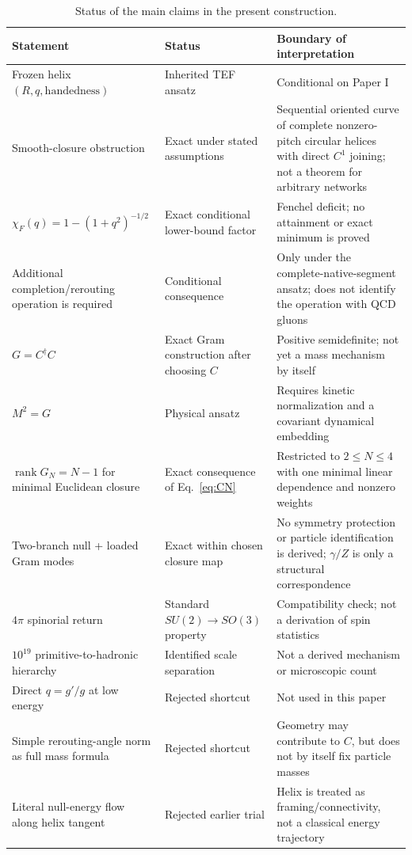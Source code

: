 \documentclass[10pt]{article}
\newcommand{\rank}{\operatorname{rank}}
\begin{document}
\begin{table}[t]
\centering
\caption{Status of the main claims in the present construction.}
\label{tab:evidence}
\small
\begin{tabular}{p{} p{} p{}}
\toprule
Statement & Status & Boundary of interpretation \\
\midrule
Frozen helix $(R,q,\text{handedness})$ & Inherited TEF ansatz & Conditional on Paper I \\
Smooth-closure obstruction & Exact under stated assumptions & Sequential oriented curve of complete nonzero-pitch circular helices with direct $C^1$ joining; not a theorem for arbitrary networks \\
$\chi_F(q)=1-(1+q^2)^{-1/2}$ & Exact conditional lower-bound factor & Fenchel deficit; no attainment or exact minimum is proved \\
Additional completion/rerouting operation is required & Conditional consequence & Only under the complete-native-segment ansatz; does not identify the operation with QCD gluons \\
$G=C^\dagger C$ & Exact Gram construction after choosing $C$ & Positive semidefinite; not yet a mass mechanism by itself \\
$M^2=G$ & Physical ansatz & Requires kinetic normalization and a covariant dynamical embedding \\
$\rank G_N=N-1$ for minimal Euclidean closure & Exact consequence of Eq.~\eqref{eq:CN} & Restricted to $2\le N\le4$ with one minimal linear dependence and nonzero weights \\
Two-branch null + loaded Gram modes & Exact within chosen closure map & No symmetry protection or particle identification is derived; $\gamma/Z$ is only a structural correspondence \\
$4\pi$ spinorial return & Standard $SU(2)\to SO(3)$ property & Compatibility check; not a derivation of spin statistics \\
$10^{19}$ primitive-to-hadronic hierarchy & Identified scale separation & Not a derived mechanism or microscopic count \\
Direct $q=g'/g$ at low energy & Rejected shortcut & Not used in this paper \\
Simple rerouting-angle norm as full mass formula & Rejected shortcut & Geometry may contribute to $C$, but does not by itself fix particle masses \\
Literal null-energy flow along helix tangent & Rejected earlier trial & Helix is treated as framing/connectivity, not a classical energy trajectory \\
\bottomrule
\end{tabular}
\end{table}
\end{document}
